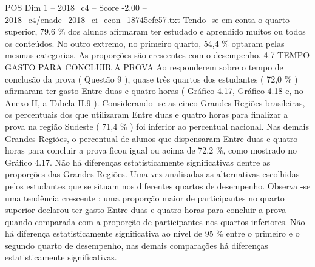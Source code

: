 \begin{textsample}{POS Dim 1 – 2018\_c4 – Score -2.00 – 2018\_c4/enade\_2018\_ci\_econ\_18745efc57.txt}
Tendo -se em conta o quarto superior, 79,6 \% dos alunos afirmaram ter estudado e aprendido muitos ou todos os conteúdos.
No outro extremo, no primeiro quarto, 54,4 \% optaram pelas mesmas categorias.
As proporções são crescentes com o desempenho. 4.7 TEMPO GASTO PARA CONCLUIR A PROVA Ao responderem sobre o tempo de conclusão da prova ( Questão 9 ), quase três quartos dos estudantes ( 72,0 \% ) afirmaram ter gasto Entre duas e quatro horas ( Gráfico 4.17, Gráfico 4.18 e, no Anexo II, a Tabela II.9 ).
Considerando -se as cinco Grandes Regiões brasileiras, os percentuais dos que utilizaram Entre duas e quatro horas para finalizar a prova na região Sudeste ( 71,4 \% ) foi inferior ao percentual nacional.
Nas demais Grandes Regiões, o percentual de alunos que dispensaram Entre duas e quatro horas para concluir a prova ficou igual ou acima de 72,2 \%, como mostrado no Gráfico 4.17.
Não há diferenças estatisticamente significativas dentre as proporções das Grandes Regiões.
Uma vez analisadas as alternativas escolhidas pelos estudantes que se situam nos diferentes quartos de desempenho.
Observa -se uma tendência crescente : uma proporção maior de participantes no quarto superior declarou ter gasto Entre duas e quatro horas para concluir a prova quando comparada com a proporção de participantes nos quartos inferiores.
Não há diferença estatisticamente significativa ao nível de 95 \% entre o primeiro e o segundo quarto de desempenho, nas demais comparações há diferenças estatisticamente significativas.

\end{textsample}
